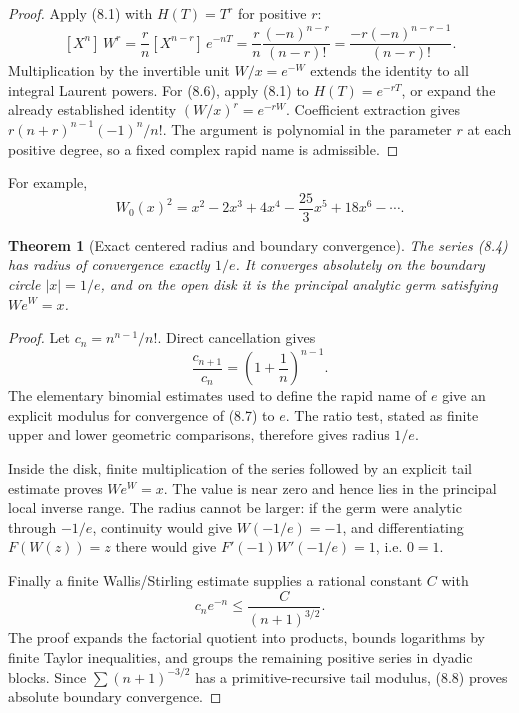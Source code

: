 \documentclass[11pt]{article}
\newtheorem{theorem}{Theorem}[section]
\theoremstyle{definition}
\newcommand{\abs}[1]{\left|#1\right|}
\newcommand{\coeff}[2]{[X^{#1}]\,#2}
\begin{document}
\begin{proof}
Apply (8.1) with \(H(T)=T^r\) for positive \(r\):
\[
 \coeff{n}{W^r}
 =\frac{r}{n}\coeff{n-r}{e^{-nT}}
 =\frac{r}{n}\frac{(-n)^{n-r}}{(n-r)!}
 =\frac{-r(-n)^{n-r-1}}{(n-r)!}.
\]
Multiplication by the invertible unit \(W/x=e^{-W}\) extends the identity to
all integral Laurent powers.  For (8.6), apply (8.1) to
\(H(T)=e^{-rT}\), or expand the already established identity
\((W/x)^r=e^{-rW}\).  Coefficient extraction gives
\(r(n+r)^{n-1}(-1)^n/n!\).  The argument is polynomial in the parameter
\(r\) at each positive degree, so a fixed complex rapid name is admissible.
\end{proof}

For example,
\[
 W_0(x)^2=x^2-2x^3+4x^4-\frac{25}{3}x^5+18x^6-\cdots.
\]

\begin{theorem}[Exact centered radius and boundary convergence]\label{thm:radius}
The series (8.4) has radius of convergence exactly \(1/e\).  It converges
absolutely on the boundary circle \(\abs{x}=1/e\), and on the open disk it is
the principal analytic germ satisfying \(We^W=x\).
\end{theorem}

\begin{proof}
Let \(c_n=n^{n-1}/n!\).  Direct cancellation gives
\[
 \frac{c_{n+1}}{c_n}=\left(1+\frac1n\right)^{n-1}.
 \tag{8.7}
\]
The elementary binomial estimates used to define the rapid name of \(e\) give
an explicit modulus for convergence of (8.7) to \(e\).  The ratio test, stated
as finite upper and lower geometric comparisons, therefore gives radius
\(1/e\).

Inside the disk, finite multiplication of the series followed by an explicit
tail estimate proves \(We^W=x\).  The value is near zero and hence lies in the
principal local inverse range.  The radius cannot be larger: if the germ were
analytic through \(-1/e\), continuity would give \(W(-1/e)=-1\), and
differentiating \(F(W(z))=z\) there would give
\(F'(-1)W'(-1/e)=1\), i.e. \(0=1\).

Finally a finite Wallis/Stirling estimate supplies a rational constant \(C\)
with
\[
 c_ne^{-n}\le\frac{C}{(n+1)^{3/2}}.
 \tag{8.8}
\]
The proof expands the factorial quotient into products, bounds logarithms by
finite Taylor inequalities, and groups the remaining positive series in
dyadic blocks.  Since \(\sum(n+1)^{-3/2}\) has a primitive-recursive tail
modulus, (8.8) proves absolute boundary convergence.
\end{proof}
\end{document}
